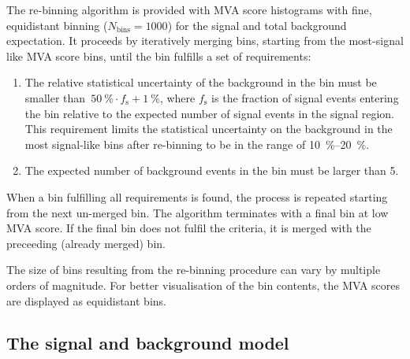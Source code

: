 The re-binning algorithm is provided with MVA score histograms with
fine, equidistant binning ($N_\text{bins} = 1000$) for the signal and
total background expectation. It proceeds by iteratively merging bins,
starting from the most-signal like MVA score bins, until the bin
fulfills a set of requirements:
\begin{enumerate}

\item The relative statistical uncertainty of the background in the
  bin must be smaller
  than~\mbox{$\SI{50}{\percent} \cdot f_\text{s} + \SI{1}{\percent}$},
  where $f_\text{s}$ is the fraction of signal events entering the bin
  relative to the expected number of signal events in the signal
  region. This requirement limits the statistical uncertainty on the
  background in the most signal-like bins after re-binning to be in
  the range of \SIrange{10}{20}{\percent}.

\item The expected number of background events in the bin must be
  larger than 5.

\end{enumerate}
When a bin fulfilling all requirements is found, the process is
repeated starting from the next un-merged bin. The algorithm
terminates with a final bin at low MVA score. If the final bin does
not fulfil the criteria, it is merged with the preceeding (already
merged) bin.



The size of bins resulting from the re-binning procedure can vary by
multiple orders of magnitude. For better visualisation of the bin
contents, the MVA scores are displayed as equidistant bins.



\subsection{The signal and background model}


